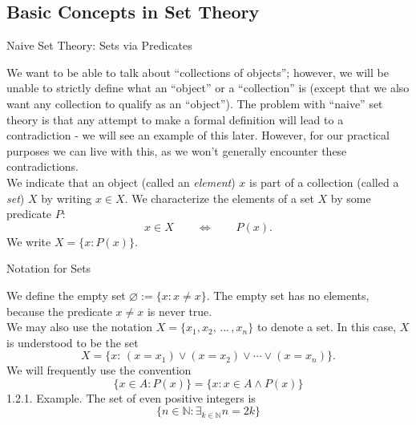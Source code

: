 \documentclass[smaller,hyperref={CJKbookmarks=true}]{beamer}
\newcommand{\N}{\mathbb{N}} \newcommand{\Z}{\mathbb{Z}} \newcommand{\Q}{\mathbb{Q}}
\begin{document}
\subsection{Basic Concepts in Set Theory}
\begin{frame}[c] \begin{spacing}{2}
\tableofcontents[sectionstyle=hide,subsectionstyle=show/shaded/hide]
\end{spacing}
\end{frame}
\begin{frame}[c]{Naive Set Theory: Sets via Predicates}
\begin{spacing}{1.1}
We want to be able to talk about ``collections of objects''; however, we will be unable to strictly define what an ``object'' or a ``collection'' is (except that we also want any collection to qualify as an ``object''). The problem with ``naive'' set theory is that any attempt to make a formal definition
will lead to a contradiction - we will see an example of this later. However,
for our practical purposes we can live with this, as we won't generally
encounter these contradictions.\\[5pt]
We indicate that an object (called an \emph{element}) $x$ is part of a collection (called a \emph{set}) $X$ by writing $x\in X$. We characterize the elements of a set $X$ by some predicate $P$:
\setcounter{equation}{0}
\begin{equation}\label{1.2.1}
  x\in X\qquad\Leftrightarrow\qquad
  P(x).
\end{equation}
We write $X=\{x:P(x)\}$.
\end{spacing}
\end{frame}
\begin{frame}[t]{Notation for Sets}
\begin{spacing}{1.1}
We define the empty set $\varnothing:=\{x\!:x\neq x\}$. The empty set has no elements, because the predicate $x\neq x$ is never true.\\[6pt]
We may also use the notation $X=\{x_1,x_2,\,...\,,x_n\}$ to denote a set. In this case, $X$ is understood to be the set
\[X=\{x\!:\,(x=x_1)\vee(x=x_2)\vee\cdots
\vee(x=x_n)\}.\]
We will frequently use the convention
\[\{x\in A\!:P(x)\}=\{x\!:x\in A\wedge P(x)\}\]
\vspace*{6pt}
\alert{1.2.1. Example.} The set of even positive integers is
\[\{n\in\N\!:\mathop{\exists}_{k\in\N}n=2k\}\]
\end{spacing}
\end{frame}
\end{document}
